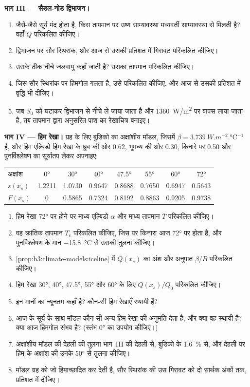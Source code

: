\begin{problem}[{सप्ताहांत समस्या --- साम्यावस्थाएँ, स्थायित्व और
हिमाच्छादन देहली}]
\medskip\noindent\textbf{भाग III --- सैडल-नोड द्विभाजन।}
\begin{enumerate}[resume]
\item जैसे-जैसे सूर्य मंद होता है, किस तापमान पर उष्ण साम्यावस्था
  मध्यवर्ती साम्यावस्था से मिलती है? वहाँ $Q$ परिकलित कीजिए।
\item द्विभाजन पर सौर स्थिरांक, और आज से उसकी प्रतिशत में
  गिरावट परिकलित कीजिए।
\item उसके ठीक नीचे जलवायु कहाँ जाती है? उसका तापमान परिकलित कीजिए।
\item जिस सौर स्थिरांक पर हिमगोल गलता है, उसे परिकलित कीजिए, और
  आज से उसकी प्रतिशत में वृद्धि भी दीजिए।
\item जब $S_0$ को घटाकर द्विभाजन से नीचे ले जाया जाता है और
  \qty{1360}{W/m^2} पर वापस लाया जाता है, तब तापमान द्वारा अनुसरित पाश का रेखाचित्र बनाइए।
\end{enumerate}

\medskip\noindent\textbf{भाग IV --- हिम रेखा।} ग्रह के लिए
बुडिको का अक्षांशीय मॉडल, जिसमें $\beta = \qty{3.739}{W.m^{-2}.\celsius^{-1}}$ है, और
हिम एल्बिडो हिम रेखा के ध्रुव की ओर 0.62, भूमध्य की ओर 0.30, किनारे पर 0.50
और पुनर्विश्लेषण का सूर्यातप लेकर अपनाइए:
\begin{center}
\begin{tabular}{lccccccc}
\hline
अक्षांश & \ang{0} & \ang{30} & \ang{40} & \ang{47.5} & \ang{55} & \ang{60} & \ang{72}\\
$s(x_s)$ & 1.2211 & 1.0730 & 0.9647 & 0.8688 & 0.7650 & 0.6947 & 0.5643\\
$F(x_s)$ & 0 & 0.5865 & 0.7324 & 0.8192 & 0.8863 & 0.9205 & 0.9738\\
\hline
\end{tabular}
\end{center}
\begin{enumerate}[resume]
\item हिम रेखा \ang{72} पर होने पर माध्य एल्बिडो $\bar\alpha$
  और माध्य तापमान $\bar T$ परिकलित कीजिए।
\item वह क्रांतिक तापमान $T_c$ परिकलित कीजिए, जिस पर किनारा
  आज \ang{72} पर होता है, और पुनर्विश्लेषण के मान \qty{-15.8}{\celsius} से उसकी तुलना कीजिए।
\item \cref{prop:b3:climate-models:iceline} में $Q(x_s)$ का अंश
  और अनुपात $\beta/B$ परिकलित कीजिए।
\item हिम रेखा \ang{30}, \ang{40},
  \ang{47.5}, \ang{55} और \ang{60} के लिए $Q(x_s)/Q_0$ परिकलित कीजिए।
\item इन मानों का न्यूनतम कहाँ है? कौन-सी हिम रेखाएँ स्थायी हैं?
\item आज के सूर्य के साथ मॉडल कौन-सी अन्य हिम रेखा की अनुमति देता है, और क्या वह
  स्थायी है? क्या आज हिमगोल संभव है? (स्तंभ \ang{0} का उपयोग कीजिए।)
\item अक्षांशीय मॉडल की देहली की तुलना भाग~III की देहली से,
  बुडिको के \qty{1.6}{\percent} से, और देहली पर हिम के अक्षांश की
  उनके \ang{50} से तुलना कीजिए।
\item मॉडल ग्रह को जो हिमाच्छादित कर देती है, सौर स्थिरांक की उस गिरावट को
  दो सार्थक अंकों तक, प्रतिशत में दीजिए।
\end{enumerate}
\end{problem}
